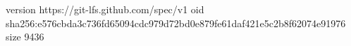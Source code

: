 version https://git-lfs.github.com/spec/v1
oid sha256:e576cbda3c736fd65094cdc979d72bd0e879fe61daf421e5c2b8f62074e91976
size 9436
